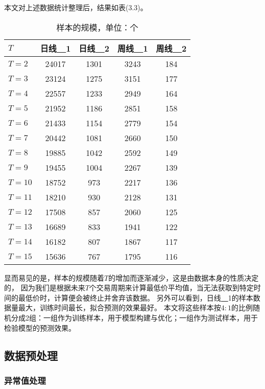 本文对上述数据统计整理后，结果如表(3.3)。
\begin{table}[ht]
    \centering
    \caption{样本的规模，单位：个}
    \begin{tabular}{lcccc}
        \hline
        {$T$} & {日线\underline{~~}1} & {日线\underline{~~}2} & {周线\underline{~~}1} & {周线\underline{~~}2}\\
        \hline
        {$T=2$} & {24017} & {1301} & {3243} & {184}\\
        {$T=3$} & {23124} & {1275} & {3151} & {177}\\
        {$T=4$} & {22557} & {1233} & {2949} & {164}\\
        {$T=5$} & {21952} & {1186} & {2851} & {158}\\
        {$T=6$} & {21433} & {1154} & {2779} & {154}\\
        {$T=7$} & {20442} & {1081} & {2660} & {150}\\
        {$T=8$} & {19885} & {1042} & {2592} & {149}\\
        {$T=9$} & {19455} & {1004} & {2267} & {139}\\
        {$T=10$} & {18752} & {973} & {2217} & {136}\\
        {$T=11$} & {18210} & {930} & {2128} & {131}\\
        {$T=12$} & {17508} & {857} & {2060} & {125}\\
        {$T=13$} & {16689} & {833} & {1941} & {122}\\
        {$T=14$} & {16182} & {807} & {1867} & {117}\\
        {$T=15$} & {15636} & {767} & {1795} & {116}\\
        \hline
    \end{tabular}
\end{table}
显而易见的是，样本的规模随着$T$的增加而逐渐减少，这是由数据本身的性质决定的，
因为我们是根据未来$T$个交易周期来计算最低价平均值，当无法获取到特定时间的最低价时，计算便会被终止并舍弃该数据。
另外可以看到，日线\underline{~~}1的样本数据量最大，训练时间最长，拟合预测的效果最好。
本文将这些样本按$4:1$的比例随机分成2组：一组作为训练样本，用于模型构建与优化；一组作为测试样本，用于检验模型的预测效果。

\subsection{数据预处理}

\subsubsection{异常值处理}

